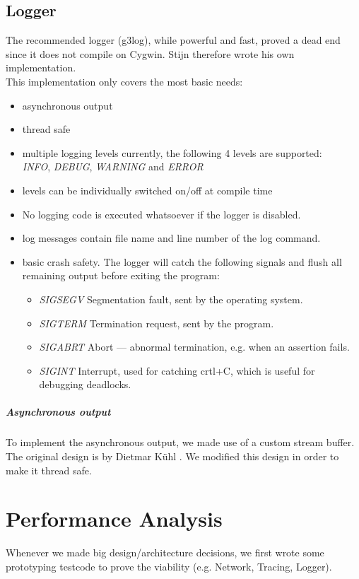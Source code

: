 \documentclass[8pt,a4paper]{report}
\begin{document}
\section{Logger}
The recommended logger (g3log), while powerful and fast, proved a dead end since it does not compile on Cygwin. 
Stijn therefore wrote his own implementation.\\
This implementation only covers the most basic needs:
\begin{itemize}
	\item asynchronous output
	\item thread safe
	\item multiple logging levels currently, the following 4 levels are supported:\\
		\emph{INFO}, \emph{DEBUG}, \emph{WARNING} and \emph{ERROR}
	\item levels can be individually switched on/off at compile time
	\item No logging code is executed whatsoever if the logger is disabled.
	\item log messages contain file name and line number of the log command.
	\item basic crash safety. The logger will catch the following signals and flush all remaining output before exiting the program:
		\begin{itemize}
			\item \emph{SIGSEGV} Segmentation fault, sent by the operating system.
			\item \emph{SIGTERM} Termination request, sent by the program.
			\item \emph{SIGABRT} Abort --- abnormal termination, e.g. when an assertion fails.
			\item \emph{SIGINT} Interrupt, used for catching crtl+C, which is useful for debugging deadlocks.
		\end{itemize}
\end{itemize}

\paragraph{Asynchronous output}
To implement the asynchronous output, we made use of a custom stream buffer. The original design is by Dietmar K{\"u}hl \cite{asynchwrite}. We modified this design in order to make it thread safe.

\chapter{Performance Analysis}
Whenever we made big design/architecture decisions, we first wrote some prototyping testcode to prove the viability (e.g. Network, Tracing, Logger).
\end{document}
